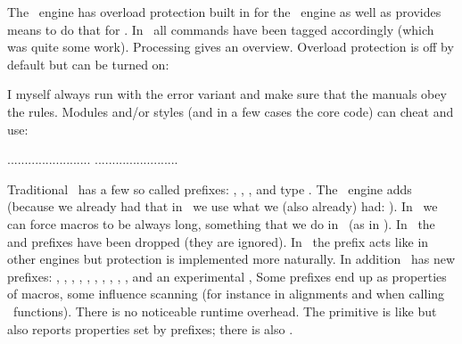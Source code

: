 \stoptitle

\starttitle[title=Overload protection]

\startitemize
    \startitem
        The \LUAMETATEX\ engine has overload protection built in for the \TEX\ engine
        as well as provides means to do that for \METAPOST.
    \stopitem
    \startitem
        In \LMTX\ all commands have been tagged accordingly (which was quite some work).
    \stopitem
    \startitem
        Processing  gives an overview.
    \stopitem
    \startitem
        Overload protection is off by default but can be turned on:

\starttyping
\enabledirectives[overloadmode=warning]
\enabledirectives[overloadmode=error]
\stoptyping

    \stopitem
    \startitem
        I myself always run with the error variant and make sure that the manuals obey
        the rules.
    \stopitem
    \startitem
        Modules and/or styles (and in a few cases the core code) can cheat and use:

\starttyping
\pushoverloadmode
    ........................
    ........................
\popoverloadmode
\stoptyping

    \stopitem
\stopitemize

\stoptitle

\starttitle[title=Details]

\startitemize
    \startitem
        Traditional \TEX\ has a few so called prefixes: \type {\global}, \type {\outer},
        \type {\long}, and type \type {\immediate}.
    \stopitem
    \startitem
        The \ETEX\ engine adds \type {\protected} (because we already had that in
        \CONTEXT\ we use what we (also already) had: \type {\unexpanded}).
    \stopitem
    \startitem
        In \LUATEX\ we can force macros to be always long, something that we do
        in \MKIV\ (as in \MKII).
    \stopitem
    \startitem
        In \LUAMETATEX\ the \type {\outer} and \type {\long} prefixes have been
        dropped (they are ignored).
    \stopitem
    \startitem
        In \LUAMETATEX\ the \type {\protected} prefix acts like in other engines
        but protection is implemented more naturally.
    \stopitem
    \startitem
        In addition \LUAMETATEX\ has new prefixes: \type {\frozen}, \type
        {\permanent}, \type {\immutable}, \type {\mutable}, \type {\noaligned},
        \type {\instance}, \type {\untraced}, \type {\tolerant}, \type
        {\overloaded}, \type {\aliased}, \type {\immediate} and an experimental
        \type {\semiprotected},
    \stopitem
    \startitem
        Some prefixes end up as properties of macros, some influence scanning (for instance
        in alignments and when calling \LUA\ functions). There is no noticeable runtime
        overhead.
    \stopitem
    \startitem
        The \type {\meaningfull} primitive is like \type {\meaning} but also reports
        properties set by prefixes; there is also \type {\meaningless}.
    \stopitem
\stopitemize

